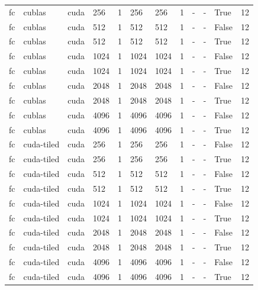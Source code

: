 \begin{tabular}{llllllllllll}
fc & cublas & cuda & 256 & 1 & 256 & 256 & 1 & - & - & True & 12 \\
fc & cublas & cuda & 512 & 1 & 512 & 512 & 1 & - & - & False & 12 \\
fc & cublas & cuda & 512 & 1 & 512 & 512 & 1 & - & - & True & 12 \\
fc & cublas & cuda & 1024 & 1 & 1024 & 1024 & 1 & - & - & False & 12 \\
fc & cublas & cuda & 1024 & 1 & 1024 & 1024 & 1 & - & - & True & 12 \\
fc & cublas & cuda & 2048 & 1 & 2048 & 2048 & 1 & - & - & False & 12 \\
fc & cublas & cuda & 2048 & 1 & 2048 & 2048 & 1 & - & - & True & 12 \\
fc & cublas & cuda & 4096 & 1 & 4096 & 4096 & 1 & - & - & False & 12 \\
fc & cublas & cuda & 4096 & 1 & 4096 & 4096 & 1 & - & - & True & 12 \\
fc & cuda-tiled & cuda & 256 & 1 & 256 & 256 & 1 & - & - & False & 12 \\
fc & cuda-tiled & cuda & 256 & 1 & 256 & 256 & 1 & - & - & True & 12 \\
fc & cuda-tiled & cuda & 512 & 1 & 512 & 512 & 1 & - & - & False & 12 \\
fc & cuda-tiled & cuda & 512 & 1 & 512 & 512 & 1 & - & - & True & 12 \\
fc & cuda-tiled & cuda & 1024 & 1 & 1024 & 1024 & 1 & - & - & False & 12 \\
fc & cuda-tiled & cuda & 1024 & 1 & 1024 & 1024 & 1 & - & - & True & 12 \\
fc & cuda-tiled & cuda & 2048 & 1 & 2048 & 2048 & 1 & - & - & False & 12 \\
fc & cuda-tiled & cuda & 2048 & 1 & 2048 & 2048 & 1 & - & - & True & 12 \\
fc & cuda-tiled & cuda & 4096 & 1 & 4096 & 4096 & 1 & - & - & False & 12 \\
fc & cuda-tiled & cuda & 4096 & 1 & 4096 & 4096 & 1 & - & - & True & 12 \\
\hline
\end{tabular}
